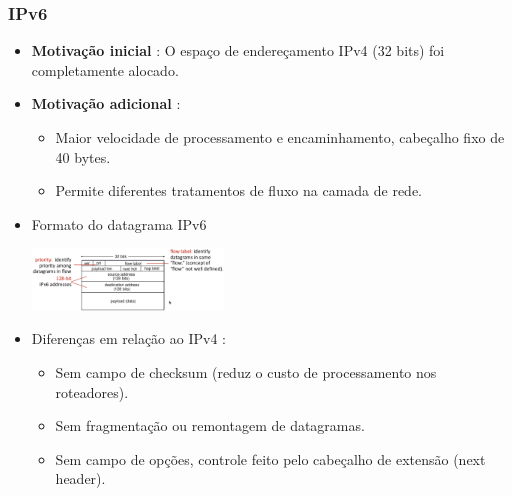         \subsubsection*{IPv6}
            \begin{itemize}[left=0.5cm, align=left, nosep]
                \item \textbf{Motivação inicial} : O espaço de endereçamento IPv4 (32 bits) foi completamente alocado.
                \item \textbf{Motivação adicional} :
                \begin{itemize}[left=0.5cm, nosep, label=$\hookrightarrow$]
                    \item Maior velocidade de processamento e encaminhamento, cabeçalho fixo de 40 bytes.  
                    \item Permite diferentes tratamentos de fluxo na camada de rede.
                \end{itemize}     
                
                \item Formato do datagrama IPv6
                \begin{center}
                    \includegraphics[width=0.4\textwidth]{img/cap-04/ipv6-formato}
                \end{center}

                \item Diferenças em relação ao IPv4 :
                \begin{itemize}[left=0.5cm, nosep, label=$\hookrightarrow$]
                    \item Sem campo de checksum (reduz o custo de processamento nos roteadores).  
                    \item Sem fragmentação ou remontagem de datagramas.  
                    \item Sem campo de opções, controle feito pelo cabeçalho de extensão (next header).
                \end{itemize} 

            \end{itemize}

